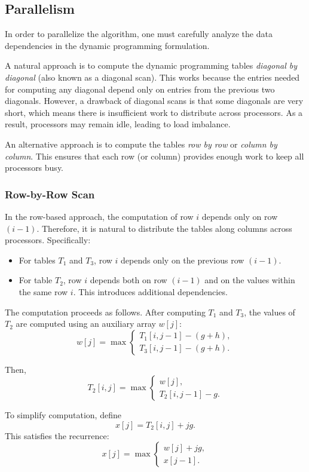 \documentclass[12pt]{book}
\begin{document}
\subsection*{Parallelism}
In order to parallelize the algorithm, one must carefully analyze the data dependencies in the dynamic programming formulation.

A natural approach is to compute the dynamic programming tables \emph{diagonal by diagonal} (also known as a diagonal scan). This works because the entries needed for computing any diagonal depend only on entries from the previous two diagonals. However, a drawback of diagonal scans is that some diagonals are very short, which means there is insufficient work to distribute across processors. As a result, processors may remain idle, leading to load imbalance.

An alternative approach is to compute the tables \emph{row by row} or \emph{column by column}. This ensures that each row (or column) provides enough work to keep all processors busy.

\subsubsection*{Row-by-Row Scan}
In the row-based approach, the computation of row $i$ depends only on row $(i-1)$. Therefore, it is natural to distribute the tables along columns across processors. Specifically:
\begin{itemize}
    \item For tables $T_1$ and $T_3$, row $i$ depends only on the previous row $(i-1)$.
    \item For table $T_2$, row $i$ depends both on row $(i-1)$ and on the values within the same row $i$. This introduces additional dependencies.
\end{itemize}

The computation proceeds as follows. After computing $T_1$ and $T_3$, the values of $T_2$ are computed using an auxiliary array $w[j]$:
\[
w[j] = \max
\begin{cases}
    T_1[i,j-1] - (g+h), \\
    T_3[i,j-1] - (g+h).
\end{cases}
\]

Then,
\[
T_2[i,j] = \max
\begin{cases}
    w[j], \\
    T_2[i,j-1] - g.
\end{cases}
\]

To simplify computation, define
\[
x[j] = T_2[i,j] + jg.
\]
This satisfies the recurrence:
\[
x[j] = \max
\begin{cases}
    w[j] + jg, \\
    x[j-1].
\end{cases}
\]
\end{document}
